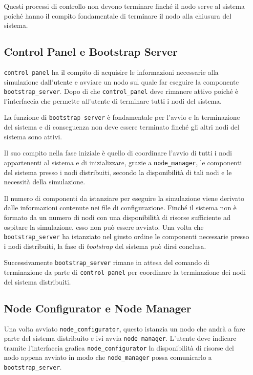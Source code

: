Questi processi di controllo non devono terminare finché il nodo serve al sistema poiché hanno il compito fondamentale di terminare il nodo \Erlang{} alla chiusura del sistema.

\subsection*{Control Panel e Bootstrap Server}
\texttt{control\_panel} ha il compito di acquisire le informazioni necessarie alla simulazione dall'utente e avviare un nodo \Erlang{} sul quale far eseguire la componente \texttt{bootstrap\_server}.
Dopo di che \texttt{control\_panel} deve rimanere attivo poiché è l'interfaccia che permette all'utente di terminare tutti i nodi del sistema.

La funzione di \texttt{bootstrap\_server} è fondamentale per l'avvio e la terminazione del sistema e di conseguenza non deve essere terminato finché gli altri nodi del sistema sono attivi.

Il suo compito nella fase iniziale è quello di coordinare l'avvio di tutti i nodi appartenenti al sistema e di inizializzare, grazie a \texttt{node\_manager}, le componenti del sistema presso i nodi distribuiti, secondo la disponibilità di tali nodi e le necessità della simulazione.

Il numero di componenti da istanziare per eseguire la simulazione viene derivato dalle informazioni contenute nei file di configurazione. Finché il sistema non è formato da un numero di nodi con una disponibilità di risorse sufficiente ad ospitare la simulazione, esso non può essere avviato.
Una volta che \texttt{bootstrap\_server} ha istanziato nel giusto ordine le componenti necessarie presso i nodi distribuiti, la fase di \textit{bootstrap} del sistema può dirsi conclusa.

Successivamente \texttt{bootstrap\_server} rimane in attesa del comando di terminazione da parte di \texttt{control\_panel} per coordinare la terminazione dei nodi del sistema distribuiti.

\subsection*{Node Configurator e Node Manager}
Una volta avviato \texttt{node\_configurator}, questo istanzia un nodo \Erlang{} che andrà a fare parte del sistema distribuito e ivi avvia \texttt{node\_manager}. L'utente deve indicare tramite l'interfaccia grafica \texttt{node\_configurator} la disponibilità di risorse del nodo \Erlang{} appena avviato in modo che \texttt{node\_manager} possa comunicarlo a \texttt{bootstrap\_server}.

